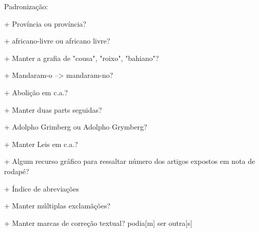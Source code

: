 Padronização:

+ Província ou província?

+ africano-livre ou africano livre?

+ Manter a grafia de "cousa", "roixo", "bahiano"?

+ Mandaram-o --> mandaram-no?

+ Abolição em c.a.?

+ Manter duas parts seguidas?


+ Adolpho Grimberg ou Adolpho Grymberg?

+ Manter Leis em c.a.?

+ Algum recurso gráfico para ressaltar número dos artigos expostos em nota de rodapé?

+ Índice de abreviações

+ Manter múltiplas exclamãções?

+ Manter marcas de correção textual? podia[m] ser outra[s]